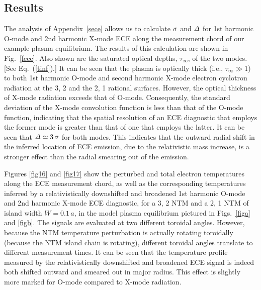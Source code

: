 \documentclass{iopjournal}
\begin{document}
\subsection{Results}
The analysis of Appendix~\ref{sece} allows us to calculate ${\mit\sigma}$ and ${\mit\Delta}$ for 1st harmonic O-mode and 2nd harmonic X-mode ECE along the
measurement chord of our example plasma equilibrium. The results of this calculation are shown in Fig.~\ref{fece}. Also shown are the saturated optical
depths, $\tau_\infty$, of the two modes. [See Eq.~(\ref{tinf}).] It can be seen that the plasma is optically thick (i.e., $\tau_\infty\gg 1$) to both
1st harmonic O-mode and second harmonic X-mode electron cyclotron radiation at the 3, 2 and the 2, 1 rational surfaces. However, the optical thickness of X-mode
radiation exceeds that of O-mode. Consequently, the standard deviation of the X-mode convolution function is less than that of the O-mode
function, indicating that the spatial resolution of an ECE diagnostic that employs the former mode is greater than that of one that employs the latter. 
It can be seen that ${\mit\Delta}\simeq 3\,\sigma$ for both modes. This indicates that the outward radial shift in the inferred location of
ECE emission, due to the relativistic mass increase, is a stronger effect than the radial smearing out of the emission. 

Figures \ref{fig16} and \ref{fig17} show the perturbed and total electron temperatures along the ECE measurement chord, as well as the corresponding temperatures inferred by a relativistically 
downshifted and broadened 1st harmonic O-mode and 2nd harmonic X-mode  ECE diagnostic, for a
3, 2 NTM and a 2, 1 NTM of island width $W=0.1\,a$,  in the model plasma equilibrium pictured in Figs.~\ref{figa} and \ref{figb}. 
The signals are evaluated at two different toroidal angles. However, because the
NTM temperature perturbation is actually rotating toroidally (because the NTM island chain is rotating), different toroidal angles translate to different measurement times. It can be seen that the temperature profile measured by the relativistically downshifted and 
broadened ECE signal is indeed both shifted outward and  smeared out in major radius. This effect is slightly more marked for O-mode compared to X-mode radiation. 
\end{document}

